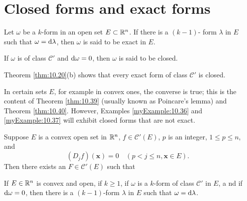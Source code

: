 
\section{Closed forms and exact forms}

\begin{myDef}
    Let $\omega$ be a $k$-form in an open set $E \subset {\protect\mathbb R}^n$. 
    If there is a $(k - 1)$- form $\lambda$ in $E$ such that $\omega = \d \lambda$, then $\omega$ is said to be exact in $E$.
    
    If $\omega$ is of class $\mathscr{C}'$ and $\d \omega = 0$, 
    then $\omega$ is said to be closed.
    
    Theorem \ref{thm:10.20}(b) shows that every exact form of class $\mathscr{C}'$ is closed.

    In certain sets $E$, for example in convex ones, the converse is true; 
    this is the content of Theorem \ref{thm:10.39} 
    (usually known as Poincare's lemma) and Theorem \ref{thm:10.40}. 
    However, Examples \ref{myExample:10.36} and \ref{myExample:10.37} will exhibit closed forms that are not exact.
\end{myDef}

\begin{myRemark}
    
\end{myRemark}

\begin{myExample}
    \label{myExample:10.36}
\end{myExample}

\begin{myExample}
    \label{myExample:10.37}
\end{myExample}

\begin{thm}
    \label{thm:10.38}
    Suppose $E$ is a convex open set in ${\protect\mathbb R}^n$,
    $f \in \mathscr{C}'(E)$, $p$ is an integer, 
    $1 \leq p \leq n$, and
    \begin{equation}
        \label{eq:10.116}
        (D_j f)(\mathbf{x}) = 0
        \quad 
        (p < j \leq n, \mathbf{x} \in E).
    \end{equation}
    Then there exists an $F \in \mathscr{C}'(E)$ such that
\end{thm}

\begin{thm}
    \label{thm:10.39}
    If $E \in {\protect\mathbb R}^n$ is convex and open, 
    if $k \geq 1$, 
    if $\omega$ is a $k$-form of class $\mathscr{C}'$ in $E$, a
    nd if $\d \omega = 0$, 
    then there is a $(k - 1)$-form $\lambda$ in $E$ 
    such that $\omega = \d \lambda$.
\end{thm}

